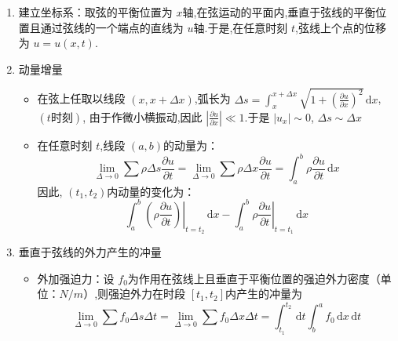 \documentclass[../../PDE.tex]{subfiles}
\begin{document}
\begin{enumerate}
    \item 建立坐标系：取弦的平衡位置为 \(  x  \)轴,在弦运动的平面内,垂直于弦线的平衡位置且通过弦线的一个端点的直线为 \(  u  \)轴.于是,在任意时刻 \(  t  \),弦线上个点的位移为 \(  u =  u\left( x,t \right)   \).
    \item 动量增量\begin{itemize}
        \item 在弦上任取以线段 \(  \left( x,x+  \Delta x \right)   \),弧长为 \(   \Delta s =  \int_{x}^{x+   \Delta  x} \sqrt{1+  \left( \frac{\partial u}{\partial x} \right) ^{2}}  \,\mathrm{d} x\), \(  \left( t \text{时刻}\right)   \),
        由于作微小横振动,因此 \(  \left| \frac{\partial u}{\partial x} \right|\ll 1   \).于是 \(  \left| u_{x}  \right|   \sim 0\), \(   \Delta   s\sim  \Delta   x  \)      
        \item 在任意时刻 \(  t  \),线段 \(  \left( a,b \right)   \)的动量为： \[
        \lim_{ \Delta  \to 0} \sum \rho  \Delta s\frac{\partial u}{\partial t} =  \lim_{ \Delta  \to 0} \sum \rho  \Delta x\frac{\partial u}{\partial t} =  \int_{a}^{b}\rho \frac{\partial u}{\partial t}\,\mathrm{d} x
        \]因此, \(  \left( t_1,t_2 \right)   \)内动量的变化为： \[
        \int_{a}^{b}\left. \left( \rho \frac{\partial u}{\partial t} \right)  \right|_{t= t_2}\,\mathrm{d} x- \int_{a}^{b}\left. \rho \frac{\partial u  }{\partial t} \right|_{ t= t_1}\,\mathrm{d} x
        \]   
    \end{itemize}
        
    \item 垂直于弦线的外力产生的冲量
    \begin{itemize}
        \item 外加强迫力：设 \(  f_0  \)为作用在弦线上且垂直于平衡位置的强迫外力密度（单位：\(  N/m  \)）,则强迫外力在时段 \(  \left[ t_1,t_2 \right]   \)内产生的冲量为 \[
        \lim_{ \Delta  \to 0} \sum f_0 \Delta s \Delta t= \lim_{ \Delta  \to 0} \sum f_0 \Delta x \Delta t = \int_{t_1}^{t_2}\,\mathrm{d} t\int_{b}^{a}f_0\,\mathrm{d} x\,\mathrm{d} t
        \] 
      
    \end{itemize}
    

\end{enumerate}
\end{document}
